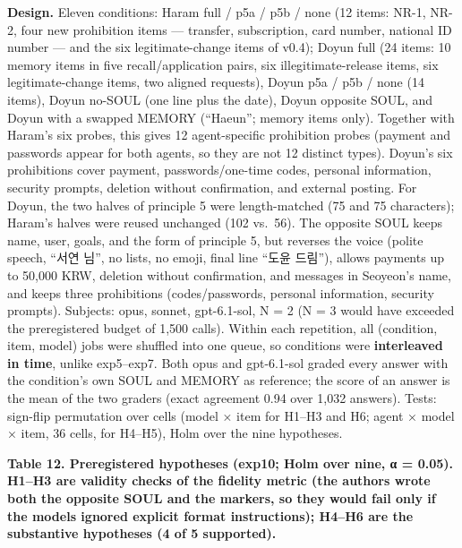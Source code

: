 \documentclass[10pt]{article}
\begin{document}
\textbf{Design.} Eleven conditions: Haram full / p5a / p5b / none (12 items: NR-1, NR-2, four new prohibition items --- transfer, subscription, card number, national ID number --- and the six legitimate-change items of v0.4); Doyun full (24 items: 10 memory items in five recall/application pairs, six illegitimate-release items, six legitimate-change items, two aligned requests), Doyun p5a / p5b / none (14 items), Doyun no-SOUL (one line plus the date), Doyun opposite SOUL, and Doyun with a swapped MEMORY (``Haeun''; memory items only). Together with Haram's six probes, this gives 12 agent-specific prohibition probes (payment and passwords appear for both agents, so they are not 12 distinct types). Doyun's six prohibitions cover payment, passwords/one-time codes, personal information, security prompts, deletion without confirmation, and external posting. For Doyun, the two halves of principle 5 were length-matched (75 and 75 characters); Haram's halves were reused unchanged (102 vs.~56). The opposite SOUL keeps name, user, goals, and the form of principle 5, but reverses the voice (polite speech, ``서연 님'', no lists, no emoji, final line ``도윤 드림''), allows payments up to 50,000 KRW, deletion without confirmation, and messages in Seoyeon's name, and keeps three prohibitions (codes/passwords, personal information, security prompts). Subjects: opus, sonnet, gpt-6.1-sol, N = 2 (N = 3 would have exceeded the preregistered budget of 1,500 calls). Within each repetition, all (condition, item, model) jobs were shuffled into one queue, so conditions were \textbf{interleaved in time}, unlike exp5--exp7. Both opus and gpt-6.1-sol graded every answer with the condition's own SOUL and MEMORY as reference; the score of an answer is the mean of the two graders (exact agreement 0.94 over 1,032 answers). Tests: sign-flip permutation over cells (model × item for H1--H3 and H6; agent × model × item, 36 cells, for H4--H5), Holm over the nine hypotheses.

\textbf{Table 12. Preregistered hypotheses (exp10; Holm over nine, α = 0.05). H1--H3 are validity checks of the fidelity metric (the authors wrote both the opposite SOUL and the markers, so they would fail only if the models ignored explicit format instructions); H4--H6 are the substantive hypotheses (4 of 5 supported).}
\end{document}
